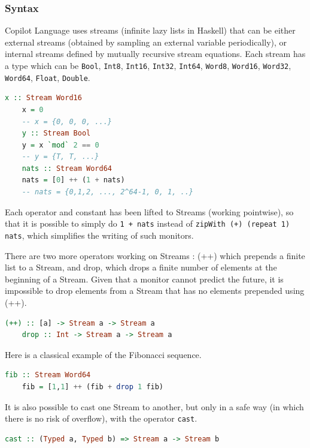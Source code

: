 \documentclass[a4paper,11pt,final]{article}
\begin{document}
	\subsubsection{Syntax}
	Copilot Language uses streams (infinite lazy lists in Haskell) that can be either external streams (obtained by sampling an external variable periodically), or internal streams defined by mutually recursive stream equations. Each stream has a type which can be \texttt{Bool}, \texttt{Int8}, \texttt{Int16}, \texttt{Int32}, \texttt{Int64}, \texttt{Word8}, \texttt{Word16}, \texttt{Word32}, \texttt{Word64}, \texttt{Float}, \texttt{Double}.
	
	\begin{lstlisting}[language=Haskell]
	x :: Stream Word16
	x = 0
	-- x = {0, 0, 0, ...}
	y :: Stream Bool
	y = x `mod` 2 == 0
	-- y = {T, T, ...}
	nats :: Stream Word64
	nats = [0] ++ (1 + nats)
	-- nats = {0,1,2, ..., 2^64-1, 0, 1, ..}  \end{lstlisting}
	
	Each operator and constant has been lifted to Streams (working pointwise), so that it is possible to simply do \texttt{1 + nats} instead of \texttt{zipWith (+) (repeat 1) nats}, which simplifies the writing of such monitors. 
	
	There are two more operators working on Streams : (++) which prepends a finite list to a Stream, and drop, which drops a finite number of elements at the beginning of a Stream. Given that a monitor cannot predict the future, it is impossible to drop elements from a Stream that has no elements prepended using (++).
	
	\begin{lstlisting}[language=Haskell]
	(++) :: [a] -> Stream a -> Stream a
	drop :: Int -> Stream a -> Stream a  \end{lstlisting}
	
	Here is a classical example of the Fibonacci sequence.
	
	\begin{lstlisting}[language=Haskell]
	fib :: Stream Word64
	fib = [1,1] ++ (fib + drop 1 fib)  \end{lstlisting}
	
	It is also possible to cast one Stream to another, but only in a safe way (in which there is no risk of overflow), with the operator \texttt{cast}.
	\begin{lstlisting}[language=Haskell]
	cast :: (Typed a, Typed b) => Stream a -> Stream b
	\end{lstlisting}
	
\end{document}

